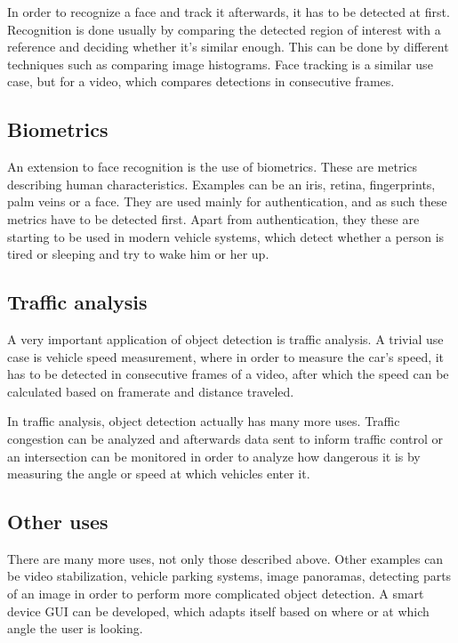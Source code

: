 In order to recognize a face and track it afterwards, it has to be detected at first. Recognition is done usually by comparing the detected region of interest with a reference and deciding whether it's similar enough. This can be done by different techniques such as comparing image histograms. Face tracking is a similar use case, but for a video, which compares detections in consecutive frames.

\subsection{Biometrics}\label{subsec:uc-biometrics}

An extension to face recognition is the use of biometrics. These are metrics describing human characteristics. Examples can be an iris, retina, fingerprints, palm veins or a face. They are used mainly for authentication, and as such these metrics have to be detected first. Apart from authentication, they these are starting to be used in modern vehicle systems, which detect whether a person is tired or sleeping and try to wake him or her up.

\subsection{Traffic analysis}\label{subsec:uc-traffic-analysis}

A very important application of object detection is traffic analysis. A trivial use case is vehicle speed measurement, where in order to measure the car's speed, it has to be detected in consecutive frames of a video, after which the speed can be calculated based on framerate and distance traveled.

In traffic analysis, object detection actually has many more uses. Traffic congestion can be analyzed and afterwards data sent to inform traffic control or an intersection can be monitored in order to analyze how dangerous it is by measuring the angle or speed at which vehicles enter it.

\subsection{Other uses}

There are many more uses, not only those described above. Other examples can be video stabilization, vehicle parking systems, image panoramas, detecting parts of an image in order to perform more complicated object detection. A smart device GUI can be developed, which adapts itself based on where or at which angle the user is looking.

